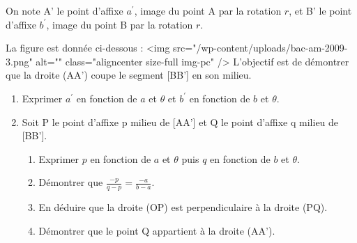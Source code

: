 \par
On note A' le point d'affixe $a^{\prime}$, image du point A par la rotation $r$, et B' le point d'affixe $b^{\prime}$, image du point B par la rotation $r$.
\par
La figure est donnée ci-dessous :
<img src="/wp-content/uploads/bac-am-2009-3.png" alt="" class="aligncenter size-full  img-pc" />
L'objectif est de démontrer que la droite (AA') coupe le segment [BB'] en son milieu.
\begin{enumerate}
     \item
     Exprimer $a^{\prime}$ en fonction de $a$ et $\theta $ et $b^{\prime}$ en fonction de $b$ et $\theta $.
     \item
     Soit P le point d'affixe p milieu de [AA'] et Q le point d'affixe q milieu de [BB'].
     \begin{enumerate}[label=\alph*.]
          \item
          Exprimer $p$ en fonction de $a$ et $\theta $ puis $q$ en fonction de $b$ et $\theta $.
          \item
          Démontrer que $\frac{-p}{q-p}=\frac{- a}{b-a}$.
          \item
          En déduire que la droite (OP) est perpendiculaire à la droite (PQ).
          \item
          Démontrer que le point Q appartient à la droite (AA').
     \end{enumerate}
\end{enumerate}
